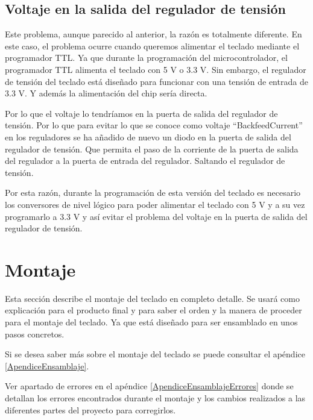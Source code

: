 \subsection{Voltaje en la salida del regulador de tensión} \label{VoltajeRegulador}
Este problema, aunque parecido al anterior, la razón es totalmente diferente. En este caso, el problema ocurre cuando queremos alimentar el teclado mediante el programador \gls{TTL}. Ya que durante la programación del microcontrolador, el programador \gls{TTL} alimenta el teclado con 5 V o 3.3 V. Sin embargo, el regulador de tensión del teclado está diseñado para funcionar con una tensión de entrada de 3.3 V. Y además la alimentación del chip sería directa.

Por lo que el voltaje lo tendríamos en la puerta de salida del regulador de tensión. Por lo que para evitar lo que se conoce como voltaje ``\gls{BackfeedCurrent}'' en los reguladores se ha añadido de nuevo un diodo en la puerta de salida del regulador de tensión. Que permita el paso de la corriente de la puerta de salida del regulador a la puerta de entrada del regulador. Saltando el regulador de tensión.

Por esta razón, durante la programación de esta versión del teclado es necesario los conversores de nivel lógico para poder alimentar el teclado con 5 V y a su vez programarlo a 3.3 V y así evitar el problema del voltaje en la puerta de salida del regulador de tensión.

\newpage
\section{Montaje}
Esta sección describe el montaje del teclado en completo detalle. Se usará como explicación para el producto final y para saber el orden y la manera de proceder para el montaje del teclado. Ya que está diseñado para ser ensamblado en unos pasos concretos.

\begin{tcolorbox}[colback=blue!5!white, colframe=blue!55!white, title=Nota]
    Si se desea saber más sobre el montaje del teclado se puede consultar el apéndice \ref{ApendiceEnsamblaje}. 
\end{tcolorbox}

\begin{tcolorbox}[colback=red!11!white, colframe=red!50!white, title=Errores]
    Ver apartado de errores en el apéndice \ref{ApendiceEnsamblajeErrores} donde se detallan los errores encontrados durante el montaje y los cambios realizados a las diferentes partes del proyecto para corregirlos.
\end{tcolorbox}

